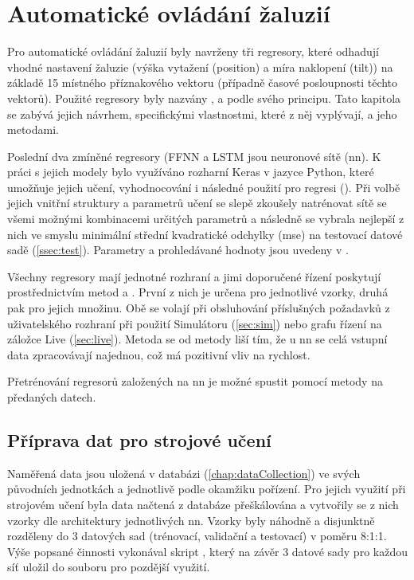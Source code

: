 \chapter{Automatické ovládání žaluzií} \label{chap:regresory}
    Pro automatické ovládání žaluzií byly navrženy tři regresory, které odhadují vhodné nastavení žaluzie (výška vytažení (position) a míra naklopení (tilt)) na základě 15 místného příznakového vektoru (případně časové posloupnosti těchto vektorů). Použité regresory byly nazvány ,  a  podle svého principu. Tato kapitola se zabývá jejich návrhem, specifickými vlastnostmi, které z něj vyplývají, a jeho metodami.
    
    Poslední dva zmíněné regresory (FFNN a LSTM jsou neuronové sítě (\acrshort{nn}). K práci s jejich modely bylo využíváno rozharní Keras v jazyce Python, které umožňuje jejich učení, vyhodnocování i následné použití pro regresi (\cite{keras:doc}). Při volbě jejich vnitřní struktury a parametrů učení se slepě zkoušely natrénovat sítě se všemi možnými kombinacemi určitých parametrů a následně se vybrala nejlepší z nich ve smyslu minimální střední kvadratické odchylky (\acrshort{mse}) na testovací datové sadě (\cref{ssec:test}). Parametry a prohledávané hodnoty jsou uvedeny v .

    Všechny regresory mají jednotné rozhraní a jimi doporučené řízení poskytují prostřednictvím metod  a . První z nich je určena pro jednotlivé vzorky, druhá pak pro jejich množinu. Obě se volají při obsluhování příslušných požadavků z uživatelského rozhraní při použití Simulátoru (\cref{sec:sim}) nebo grafu řízení na záložce Live (\cref{sec:live}). Metoda  se od metody  liší tím, že u \acrshort{nn} se celá vstupní data zpracovávají najednou, což má pozitivní vliv na rychlost. %
    
    Přetrénování regresorů založených na \acrshort{nn} je možné spustit pomocí metody  na předaných datech.

    \section{Příprava dat pro strojové učení} \label{sec:data_prep}
        Naměřená data jsou uložená v databázi (\cref{chap:dataCollection}) ve svých původních jednotkách a jednotlivě podle okamžiku pořízení. Pro jejich využití při strojovém učení byla data načtená z databáze přeškálována a vytvořily se z nich vzorky dle architektury jednotlivých \acrshort{nn}. Vzorky byly náhodně a disjunktně rozděleny do 3 datových sad (trénovací, validační a testovací) v poměru 8:1:1. Výše popsané činnosti vykonával skript , který na závěr 3 datové sady pro každou síť uložil do souboru pro pozdější využití.
        
